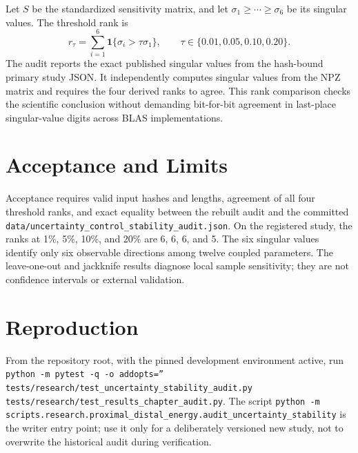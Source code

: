 \documentclass[11pt]{article}
\begin{document}
Let $S$ be the standardized sensitivity matrix, and let
$\sigma_1\geq\cdots\geq\sigma_6$ be its singular values. The threshold rank is
\begin{equation}
 r_{\tau}=\sum_{i=1}^{6}\mathbf{1}\{\sigma_i>\tau\sigma_1\},
 \qquad \tau\in\{0.01,0.05,0.10,0.20\}.
\end{equation}
The audit reports the exact published singular values from the hash-bound
primary study JSON. It independently computes singular values from the NPZ
matrix and requires the four derived ranks to agree. This rank comparison
checks the scientific conclusion without demanding bit-for-bit agreement in
last-place singular-value digits across BLAS implementations.

\section{Acceptance and Limits}
Acceptance requires valid input hashes and lengths, agreement of all four
threshold ranks, and exact equality between the rebuilt audit and the committed
\texttt{data/uncertainty\_control\_stability\_audit.json}. On the registered
study, the ranks at 1\%, 5\%, 10\%, and 20\% are 6, 6, 6, and 5.
The six singular values identify only six observable directions among twelve
coupled parameters. The leave-one-out and jackknife results diagnose local
sample sensitivity; they are not confidence intervals or external validation.

\section{Reproduction}
From the repository root, with the pinned development environment active,
run \texttt{python -m pytest -q -o addopts='' tests/research/test\_uncertainty\_stability\_audit.py
tests/research/test\_results\_chapter\_audit.py}. The script
\texttt{python -m scripts.research.proximal\_distal\_energy.audit\_uncertainty\_stability}
is the writer entry point; use it only for a deliberately versioned new study,
not to overwrite the historical audit during verification.
\end{document}
